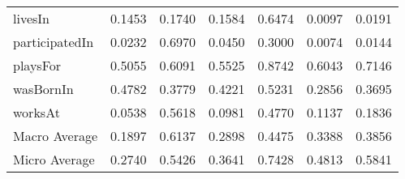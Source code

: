\begin{table}[htbp]
\begin{center}
\begin{tabular}{|l||c|c|c||c|c|c|}
livesIn & 0.1453 & 0.1740 & 0.1584 & 0.6474 & 0.0097 & 0.0191 \\
participatedIn & 0.0232 & 0.6970 & 0.0450 & 0.3000 & 0.0074 & 0.0144 \\
playsFor & 0.5055 & 0.6091 & 0.5525 & 0.8742 & 0.6043 & 0.7146 \\
wasBornIn & 0.4782 & 0.3779 & 0.4221 & 0.5231 & 0.2856 & 0.3695 \\
worksAt & 0.0538 & 0.5618 & 0.0981 & 0.4770 & 0.1137 & 0.1836 \\
\hline
Macro Average & 0.1897 & 0.6137 & 0.2898 & 0.4475 & 0.3388 & 0.3856 \\
Micro Average & 0.2740 & 0.5426 & 0.3641 & 0.7428 & 0.4813 & 0.5841 \\
\hline
\end{tabular}
\end{center}
\end{table}

